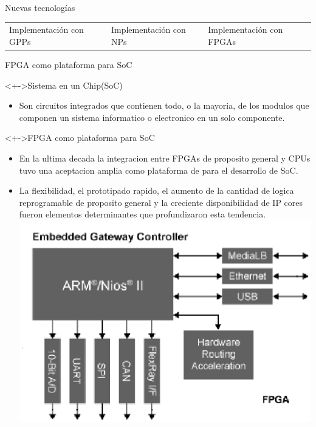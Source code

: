 \documentclass[xcolor=dvipsnames]{beamer}
\begin{document}
\begin{frame}{Nuevas tecnologías}
\begin{tabularx}{\linewidth}{VVV}
      \\
      \tiny Implementación con GPPs
      &
      \tiny Implementación con NPs
      &
      \tiny Implementación con FPGAs
      \\
    \end{tabularx}
\end{frame}

\begin{frame}{FPGA como plataforma para SoC}

  \begin{block}<+->{Sistema en un Chip(SoC)} 
    \begin{itemize}
      \scriptsize
      \item Son circuitos integrados que contienen todo, o la mayoria, de los modulos que componen un sistema informatico o electronico en un solo componente.
    \end{itemize}      
  \end{block}

  \begin{block}<+->{FPGA como plataforma para SoC} 
    \begin{itemize}
      \scriptsize
      \item En la ultima decada la integracion entre FPGAs de proposito general y CPUs tuvo una aceptacion amplia como plataforma de para el desarrollo de SoC.    
	\item La flexibilidad, el prototipado rapido, el aumento de la cantidad de logica reprogramable de proposito general y la creciente disponibilidad de IP cores fueron elementos determinantes que profundizaron esta tendencia.
	\center
        \includegraphics[scale=0.35]{figures/soc2.eps} 

    \end{itemize}      
  \end{block}
\end{frame}
\end{document}
